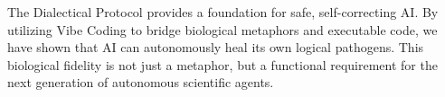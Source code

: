 The Dialectical Protocol provides a foundation for safe, self-correcting AI. By utilizing Vibe Coding to bridge biological metaphors and executable code, we have shown that AI can autonomously heal its own logical pathogens. This biological fidelity is not just a metaphor, but a functional requirement for the next generation of autonomous scientific agents.
